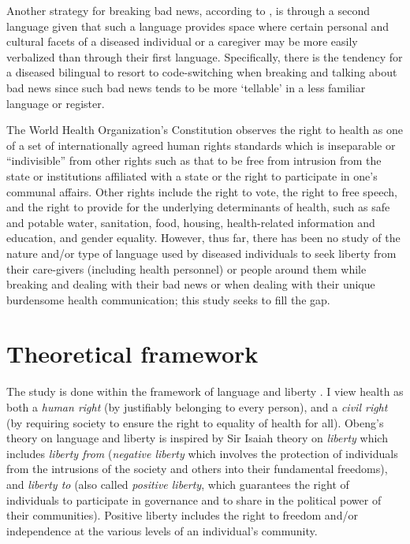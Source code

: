 \documentclass[output=paper,colorlinks,citecolor=brown]{langscibook}
\begin{document}
Another strategy for breaking bad news, according to \citet{Movahedi1996}, is through a second language given that such a language provides space where certain personal and cultural facets of a diseased individual or a caregiver may be more easily verbalized than through their first language. Specifically, there is the tendency for a diseased bilingual to resort to code-switching when breaking and talking about bad news since such bad news tends to be more ‘tellable’ in a less familiar language or register.

The World Health Organization’s Constitution \citep{World-Health-Organization1946} observes the right to health as one of a set of internationally agreed human rights standards which is inseparable or “indivisible” from other rights such as that to be free from intrusion from the state or institutions affiliated with a state or the right to participate in one’s communal affairs. Other rights include the right to vote, the right to free speech, and the right to provide for the underlying determinants of health, such as safe and potable water, sanitation, food, housing, health-related information and education, and gender equality. However, thus far, there has been no study of the nature and\slash or type of language used by diseased individuals to seek liberty from their care-givers (including health personnel) or people around them while breaking and dealing with their bad news or when dealing with their unique burdensome health communication; this study seeks to fill the gap. 

\section{Theoretical framework}\label{sec:obeng:2}

The study is done within the framework of language and liberty \citep{Obeng2020, Obeng2018}. I view health as both a \textit{human right} (by justifiably belonging to every person), and a \textit{civil right} (by requiring society to ensure the right to equality of health for all). Obeng’s theory on language and liberty is inspired by Sir Isaiah   theory on \textit{liberty} which includes \textit{liberty from} (\textit{negative liberty} which involves the protection of individuals from the intrusions of the society and others into their fundamental freedoms), and \textit{liberty to} (also called \textit{positive liberty}, which guarantees the right of individuals to participate in governance and to share in the political power of their communities). Positive liberty includes the right to freedom and/or independence at the various levels of an individual’s community. 
\end{document}
